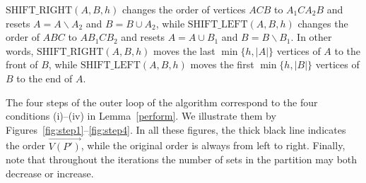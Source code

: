 \documentclass[reqno, 12pt]{amsart}
\numberwithin{equation}{section}
\numberwithin{figure}{section}
\let\setminus=\smallsetminus
\theoremstyle{plain}
\theoremstyle{definition}
\begin{document}
 $\textrm{SHIFT\_RIGHT}(A,B,h)$ changes the order of vertices $ACB$ to $A_1CA_2B$ and resets $A = A\setminus A_2$ and $B = B\cup A_2$, while $\textrm{SHIFT\_LEFT}(A,B,h)$ changes the order of $ABC$ to $AB_1CB_2$ and resets $A = A\cup B_1$ and $B = B\setminus B_1$. In other words, $\textrm{SHIFT\_RIGHT}(A,B,h)$ moves the last $\min\{h,|A|\}$ vertices of $A$ to the front of $B$, while $\textrm{SHIFT\_LEFT}(A,B,h)$ moves the first $\min\{h,|B|\}$ vertices of $B$ to the end of $A$. %

The four steps of the outer loop of the algorithm correspond to the four conditions (i)--(iv) in Lemma~\ref{perform}. We illustrate them by Figures~\ref{fig:step1}--\ref{fig:step4}. In all these figures, the thick black line indicates the order  $\overrightarrow{V(P')}$, while the original order is always from left to right.
Finally, note that throughout the iterations the number of sets in the partition may both decrease or increase.
\end{document}

